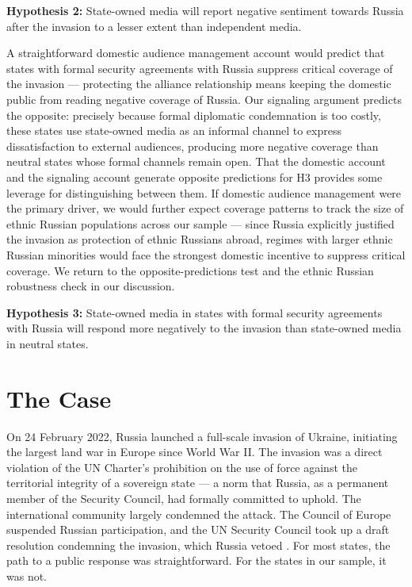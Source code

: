 \documentclass[12pt]{article}
\begin{document}
\textbf{Hypothesis 2:} State-owned media will report negative sentiment towards Russia after the invasion to a lesser extent than independent media. 

A straightforward domestic audience management account would predict that states with formal security agreements with Russia suppress critical coverage of the invasion — protecting the alliance relationship means keeping the domestic public from reading negative coverage of Russia. Our signaling argument predicts the opposite: precisely because formal diplomatic condemnation is too costly, these states use state-owned media as an informal channel to express dissatisfaction to external audiences, producing more negative coverage than neutral states whose formal channels remain open. That the domestic account and the signaling account generate opposite predictions for H3 provides some leverage for distinguishing between them. If domestic audience management were the primary driver, we would further expect coverage patterns to track the size of ethnic Russian populations across our sample — since Russia explicitly justified the invasion as protection of ethnic Russians abroad, regimes with larger ethnic Russian minorities would face the strongest domestic incentive to suppress critical coverage. We return to the opposite-predictions test and the ethnic Russian robustness check in our discussion.

\textbf{Hypothesis 3:} State-owned media in states with formal security agreements with Russia will respond more negatively to the invasion than state-owned media in neutral states.

\section*{The Case}

On 24 February 2022, Russia launched a full-scale invasion of Ukraine, initiating the largest land war in Europe since World War II. The invasion was a direct violation of the UN Charter's prohibition on the use of force against the territorial integrity of a sovereign state \citep{nations_charter_1945}--- a norm that Russia, as a permanent member of the Security Council, had formally committed to uphold. The international community largely condemned the attack. The Council of Europe suspended Russian participation, and the UN Security Council took up a draft resolution condemning the invasion, which Russia vetoed \citep{walker_conflict_2024}. For most states, the path to a public response was straightforward. For the states in our sample, it was not.
\end{document}

